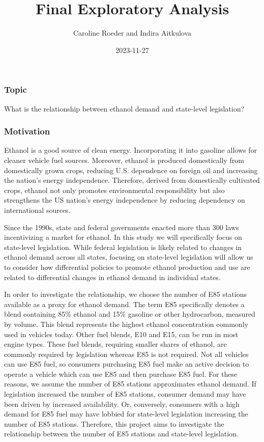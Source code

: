 \documentclass[
]{article}
\title{Final Exploratory Analysis}
\author{Caroline Roeder and Indira Aitkulova}
\date{2023-11-27}
\begin{document}
\maketitle

\hypertarget{topic}{%
\subsubsection{Topic}\label{topic}}

What is the relationship between ethanol demand and state-level
legislation?

\hypertarget{motivation}{%
\subsubsection{Motivation}\label{motivation}}

Ethanol is a good source of clean energy. Incorporating it into gasoline
allows for cleaner vehicle fuel sources. Moreover, ethanol is produced
domestically from domestically grown crops, reducing U.S. dependence on
foreign oil and increasing the nation's energy independence. Therefore,
derived from domestically cultivated crops, ethanol not only promotes
environmental responsibility but also strengthens the US nation's energy
independence by reducing dependency on international sources.

Since the 1990s, state and federal governments enacted more than 300
laws incentivizing a market for ethanol. In this study we will
specifically focus on state-level legislation. While federal legislation
is likely related to changes in ethanol demand across all states,
focusing on state-level legislation will allow us to consider how
differential policies to promote ethanol production and use are related
to differential changes in ethanol demand in individual states.

In order to investigate the relationship, we choose the number of E85
stations available as a proxy for ethanol demand. The term E85
specifically denotes a blend containing 85\% ethanol and 15\% gasoline
or other hydrocarbon, measured by volume. This blend represents the
highest ethanol concentration commonly used in vehicles today. Other
fuel blends, E10 and E15, can be run in most engine types. These fuel
blends, requiring smaller shares of ethanol, are commonly required by
legislation whereas E85 is not required. Not all vehicles can use E85
fuel, so consumers purchasing E85 fuel make an active decision to
operate a vehicle which can use E85 and then purchase E85 fuel. For
these reasons, we assume the number of E85 stations approximates ethanol
demand. If legislation increased the number of E85 stations, consumer
demand may have been driven by increased availability. Or, conversely,
consumers with a high demand for E85 fuel may have lobbied for
state-level legislation increasing the number of E85 stations.
Therefore, this project aims to investigate the relationship between the
number of E85 stations and state-level legislation.
\end{document}
